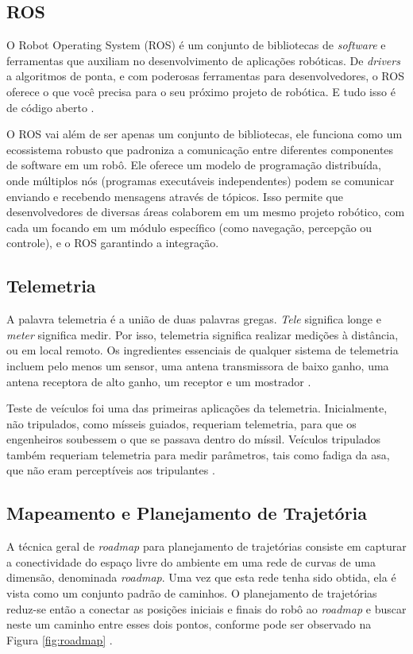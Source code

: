 \subsection{ROS}
O Robot Operating System (ROS) é um conjunto de bibliotecas de \textit{software} e ferramentas que auxiliam no desenvolvimento de aplicações robóticas. De \textit{drivers} a algoritmos de ponta, e com poderosas ferramentas para desenvolvedores, o ROS oferece o que você precisa para o seu próximo projeto de robótica. E tudo isso é de código aberto \cite{ROS_Website}.

O ROS vai além de ser apenas um conjunto de bibliotecas, ele funciona como um ecossistema robusto que padroniza a comunicação entre diferentes componentes de software em um robô. Ele oferece um modelo de programação distribuída, onde múltiplos nós (programas executáveis independentes) podem se comunicar enviando e recebendo mensagens através de tópicos. Isso permite que desenvolvedores de diversas áreas colaborem em um mesmo projeto robótico, com cada um focando em um módulo específico (como navegação, percepção ou controle), e o ROS garantindo a integração.

\subsection{Telemetria}
A palavra telemetria é a união de duas palavras gregas. \textit{Tele} significa longe e 
\textit{meter} significa medir. Por isso, telemetria significa realizar medições à distância, ou em local remoto. Os ingredientes essenciais de qualquer sistema de telemetria incluem pelo menos um sensor, uma antena transmissora de baixo ganho, uma antena receptora de alto ganho, um receptor e um mostrador \cite{Telemetria}. 

Teste de veículos foi uma das primeiras aplicações da telemetria. Inicialmente, não tripulados, como mísseis guiados, requeriam telemetria, para que os engenheiros soubessem o que se passava dentro do míssil. Veículos tripulados também requeriam telemetria para medir parâmetros, tais como fadiga da asa, que não eram perceptíveis aos tripulantes 
\cite{Telemetria}.

\subsection{Mapeamento e Planejamento de Trajetória}
A técnica geral de \textit{roadmap} para planejamento de trajetórias consiste em capturar a conectividade do espaço livre do ambiente em uma rede de curvas de uma dimensão, denominada \textit{roadmap}. Uma vez que esta rede tenha sido obtida, ela é vista como um conjunto padrão de caminhos. O planejamento de trajetórias reduz-se então a conectar as posições iniciais e finais do robô ao \textit{roadmap} e buscar neste um caminho entre esses dois pontos, conforme pode ser observado na Figura \ref{fig:roadmap} \cite{PlanejamentoTrajetoria}.

